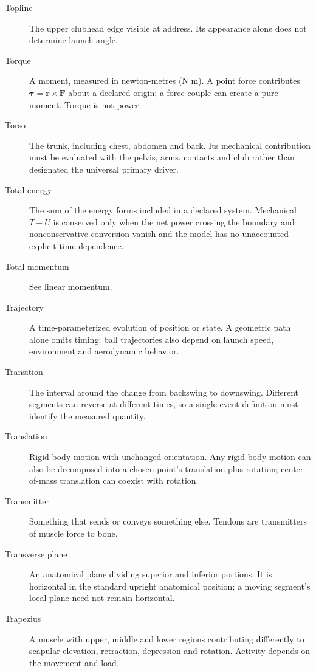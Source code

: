 \begin{description}
\item[Topline] The upper clubhead edge visible at address. Its appearance alone does not determine launch angle.

\item[Torque] A moment, measured in newton-metres (N m). A point force contributes $\boldsymbol{\tau}=\mathbf{r}\times\mathbf{F}$ about a declared origin; a force couple can create a pure moment. Torque is not power.

\item[Torso] The trunk, including chest, abdomen and back. Its mechanical contribution must be evaluated with the pelvis, arms, contacts and club rather than designated the universal primary driver.

\item[Total energy] The sum of the energy forms included in a declared system. Mechanical $T+U$ is conserved only when the net power crossing the boundary and nonconservative conversion vanish and the model has no unaccounted explicit time dependence.

\item[Total momentum] See linear momentum.

\item[Trajectory] A time-parameterized evolution of position or state. A geometric path alone omits timing; ball trajectories also depend on launch speed, environment and aerodynamic behavior.

\item[Transition] The interval around the change from backswing to downswing. Different segments can reverse at different times, so a single event definition must identify the measured quantity.

\item[Translation] Rigid-body motion with unchanged orientation. Any rigid-body motion can also be decomposed into a chosen point's translation plus rotation; center-of-mass translation can coexist with rotation.

\item[Transmitter] Something that sends or conveys something else. Tendons are transmitters of muscle force to bone.

\item[Transverse plane] An anatomical plane dividing superior and inferior portions. It is horizontal in the standard upright anatomical position; a moving segment's local plane need not remain horizontal.

\item[Trapezius] A muscle with upper, middle and lower regions contributing differently to scapular elevation, retraction, depression and rotation. Activity depends on the movement and load.


\end{description}
